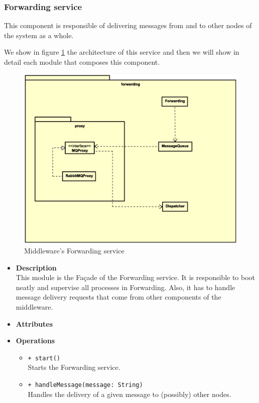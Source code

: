 \subsubsection{Forwarding service}

This component is responsible of delivering messages from and to other nodes of
the system as a whole.

We show in figure \ref{fig:mw-forwarding} the architecture of this service and
then we will show in detail each module that composes this component.

\begin{figure}[H]
  \centering
  \includegraphics[width=\columnwidth]{images/solution/mw/forwarding.eps}
  \caption{Middleware's Forwarding service}
  \label{fig:mw-forwarding}
\end{figure}

\FloatBarrier
\begin{itemize}
  \item \textbf{Description} \\
    This module is the Fa\c cade of the Forwarding service. It is responsible
    to boot neatly and supervise all processes in Forwarding. Also, it has to
    handle message delivery requests that come from other components of the
    middleware.
  \item \textbf{Attributes}
  \item \textbf{Operations}
  \begin{itemize}
    \item \texttt{+ start()} \\
    Starts the Forwarding service.
    \item \texttt{+ handleMessage(message: String)} \\
    Handles the delivery of a given message to (possibly) other nodes.
  \end{itemize}
\end{itemize}

